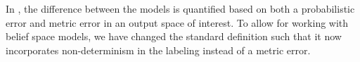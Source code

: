 \documentclass{ifacconf}
\newcommand{\red}[1]{{\color{red} #1}}
\renewcommand{\axx}[1]{{\color{orange} Ali: #1}}
\begin{document}
In \citet{haesaert2017verification}, the difference between the models is quantified based on both a probabilistic error and metric error in an output space of interest. To allow for working with belief space models, we have changed the standard definition such that it now incorporates non-determinism  in the labeling instead of a metric error.
% 
%
 
\end{document}
